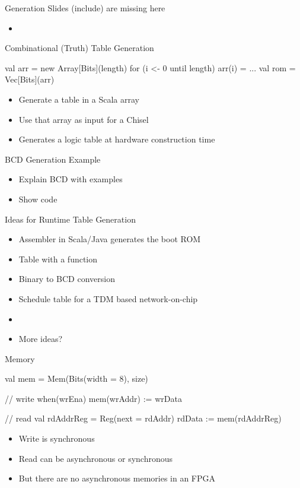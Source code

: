 %

\begin{frame}[fragile]{Generation Slides (include) are missing here}
\begin{itemize}
\item 
\end{itemize}
\end{frame}

\begin{frame}[fragile]{Combinational (Truth) Table Generation}
\begin{chisel}
val arr = new Array[Bits](length)
for (i <- 0 until length) {
  arr(i) = ...
}
val rom = Vec[Bits](arr)
\end{chisel}
\begin{itemize}
\item Generate a table in a Scala array
\item Use that array as input for a Chisel 
\item Generates a logic table at hardware construction time
\end{itemize}
\end{frame}

\begin{frame}[fragile]{BCD Generation Example}
\begin{itemize}
\item Explain BCD with examples
\item Show code
\end{itemize}
\end{frame}

\begin{frame}[fragile]{Ideas for Runtime Table Generation}
\begin{itemize}
\item Assembler in Scala/Java generates the boot ROM
\item Table with a  function
\item Binary to BCD conversion
\item Schedule table for a TDM based network-on-chip
\item 
\item More ideas?
\end{itemize}
\end{frame}

\begin{frame}[fragile]{Memory}
\begin{chisel}
val mem = Mem(Bits(width = 8), size)

// write
when(wrEna) {
  mem(wrAddr) := wrData
}

// read
val rdAddrReg = Reg(next = rdAddr)
rdData := mem(rdAddrReg)
\end{chisel}
\begin{itemize}
\item Write is synchronous
\item Read can be asynchronous or synchronous
\item But there are no asynchronous memories in an FPGA
\end{itemize}
\end{frame}


